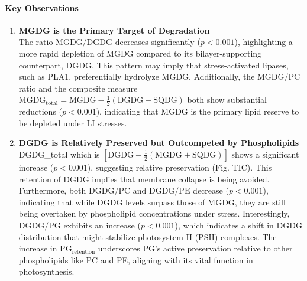 \documentclass[10pt,letterpaper]{article}
\begin{document}
\paragraph{Key Observations}
\begin{enumerate}
  \item \textbf{MGDG is the Primary Target of Degradation} \\
  The ratio \(\mathrm{MGDG/DGDG}\) decreases significantly (\(p<0.001\)), highlighting a more rapid depletion of MGDG compared to its bilayer-supporting counterpart, DGDG. This pattern may imply that stress-activated lipases, such as PLA1, preferentially hydrolyze MGDG. Additionally, the \(\mathrm{MGDG/PC}\) ratio and the composite measure \(\mathrm{MGDG}_{\mathrm{total}} = \mathrm{MGDG} - \tfrac12(\mathrm{DGDG}+\mathrm{SQDG})\) both show substantial reductions (\(p<0.001\)), indicating that MGDG is the primary lipid reserve to be depleted under LI stresses.
  
  \item \textbf{DGDG is Relatively Preserved but Outcompeted by Phospholipids} \\
  DGDG\_total which is \([\mathrm{DGDG} - \tfrac12(\mathrm{MGDG}+\mathrm{SQDG})]\) shows a significant increase (\(p<0.001\)), suggesting relative preservation (Fig. TIC). This retention of DGDG implies that membrane collapse is being avoided. Furthermore, both \(\mathrm{DGDG/PC}\) and \(\mathrm{DGDG/PE}\) decrease (\(p<0.001\)), indicating that while DGDG levels surpass those of MGDG, they are still being overtaken by phospholipid concentrations under stress. Interestingly, \(\mathrm{DGDG/PG}\) exhibits an increase (\(p<0.001\)), which indicates a shift in DGDG distribution that might stabilize photosystem II (PSII) complexes. The increase in PG$_{\text{retention}}$ underscores PG's active preservation relative to other phospholipids like PC and PE, aligning with its vital function in photosynthesis.
\end{enumerate}
\end{document}
